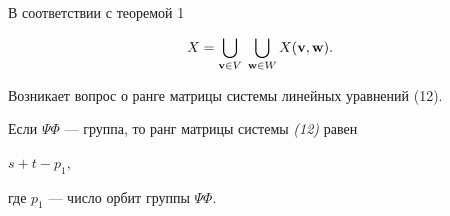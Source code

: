 В соответствии с теоремой 1


\begin{equation}


X=\bigcup_{\bold v\in V}\;\bigcup_{\bold w\in W}


X(\bold v,\bold w).


\end{equation}





Возникает вопрос о ранге матрицы системы линейных уравнений (12).





\begin{thm}


Если $\Psi\Phi$ --- группа, то ранг матрицы системы {\em (12)} равен


$s+t-p_1$,


где $p_1$ --- число орбит группы $\Psi\Phi$.


\end{thm}





